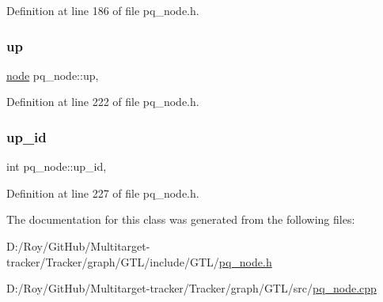 Definition at line 186 of file pq\+\_\+node.\+h.

\mbox{\label{classpq__node_ae6d5a236397b9a57159487eac7ec168d}} 
\subsubsection{\texorpdfstring{up}{up}}
{\footnotesize\ttfamily \mbox{\hyperlink{classnode}{node}} pq\+\_\+node\+::up\hspace{0.3cm}{\ttfamily [protected]}, {\ttfamily [inherited]}}



Definition at line 222 of file pq\+\_\+node.\+h.

\mbox{\label{classpq__node_a5a7bcdde1f57191a77a6a14994b38a50}} 
\subsubsection{\texorpdfstring{up\+\_\+id}{up\_id}}
{\footnotesize\ttfamily int pq\+\_\+node\+::up\+\_\+id\hspace{0.3cm}{\ttfamily [protected]}, {\ttfamily [inherited]}}



Definition at line 227 of file pq\+\_\+node.\+h.



The documentation for this class was generated from the following files\+:\begin{DoxyCompactItemize}
\item 
D\+:/\+Roy/\+Git\+Hub/\+Multitarget-\/tracker/\+Tracker/graph/\+G\+T\+L/include/\+G\+T\+L/\mbox{\hyperlink{pq__node_8h}{pq\+\_\+node.\+h}}\item 
D\+:/\+Roy/\+Git\+Hub/\+Multitarget-\/tracker/\+Tracker/graph/\+G\+T\+L/src/\mbox{\hyperlink{pq__node_8cpp}{pq\+\_\+node.\+cpp}}\end{DoxyCompactItemize}
